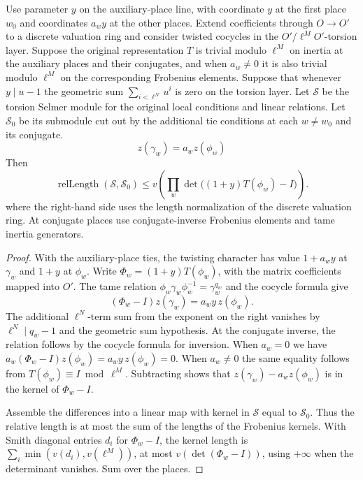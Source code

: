 \begin{lemma}
\label{lem:c-selmer-untied-length}
\emitthmsource
Use parameter $y$ on the auxiliary-place line, with coordinate $y$ at the first place $w_0$ and coordinates $a_wy$ at the other places. Extend coefficients through $O\to O'$ to a discrete valuation ring and consider twisted cocycles in the $O'/\ell^M O'$-torsion layer. Suppose the original representation $T$ is trivial modulo $\ell^M$ on inertia at the auxiliary places and their conjugates, and when $a_w\ne0$ it is also trivial modulo $\ell^M$ on the corresponding Frobenius elements. Suppose that whenever $y\mid u-1$ the geometric sum $\sum_{i<\ell^N}u^i$ is zero on the torsion layer. Let $\mathcal S$ be the torsion Selmer module for the original local conditions and linear relations. Let $\mathcal S_0$ be its submodule cut out by the additional tie conditions at each $w\ne w_0$ and its conjugate.
\[
 z(\gamma_w)=a_w z(\phi_w)
\]
Then
\[
 \operatorname{relLength}(\mathcal S,\mathcal S_0)
 \le v\!\left(\prod_w\det\bigl((1+y)T(\phi_w)-I\bigr)\right).
\]
where the right-hand side uses the length normalization of the discrete valuation ring. At conjugate places use conjugate-inverse Frobenius elements and tame inertia generators.
\end{lemma}

\begin{proof}
With the auxiliary-place ties, the twisting character has value $1+a_wy$ at $\gamma_w$ and $1+y$ at $\phi_w$. Write $\Phi_w=(1+y)T(\phi_w)$, with the matrix coefficients mapped into $O'$. The tame relation $\phi_w\gamma_w\phi_w^{-1}=\gamma_w^{q_w}$ and the cocycle formula give
\[
 (\Phi_w-I)z(\gamma_w)=a_w y\,z(\phi_w).
\]
The additional $\ell^N$-term sum from the exponent on the right vanishes by $\ell^N\mid q_w-1$ and the geometric sum hypothesis. At the conjugate inverse, the relation follows by the cocycle formula for inversion. When $a_w=0$ we have $a_w(\Phi_w-I)z(\phi_w)=a_wy\,z(\phi_w)=0$. When $a_w\ne0$ the same equality follows from $T(\phi_w)\equiv I\bmod\ell^M$. Subtracting shows that $z(\gamma_w)-a_wz(\phi_w)$ is in the kernel of $\Phi_w-I$.

Assemble the differences into a linear map with kernel in $\mathcal S$ equal to $\mathcal S_0$. Thus the relative length is at most the sum of the lengths of the Frobenius kernels. With Smith diagonal entries $d_i$ for $\Phi_w-I$, the kernel length is $\sum_i\min(v(d_i),v(\ell^M))$, at most $v(\det(\Phi_w-I))$, using $+\infty$ when the determinant vanishes. Sum over the places.
\end{proof}

